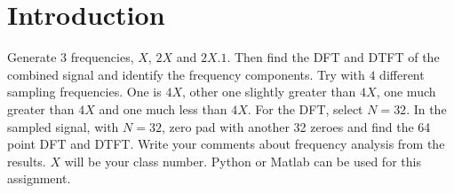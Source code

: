 \documentclass[../../course]{subfiles}
\begin{document}
\section{Introduction} \label{sec:wrkFrequencyAnalysisIntro}

Generate $3$ frequencies, $X$, $2X$ and $2X.1$. Then find the DFT and DTFT of
the combined signal and identify the frequency components. Try with $4$
different sampling frequencies. One is $4X$, other one slightly greater than
$4X$, one much greater than $4X$ and one much less than $4X$. For the DFT,
select $N = 32$. In the sampled signal, with $N = 32$, zero pad with another 32
zeroes and find the 64 point DFT and DTFT. Write your comments about frequency
analysis from the results. $X$ will be your class number. Python or Matlab can
be used for this assignment.
\end{document}
